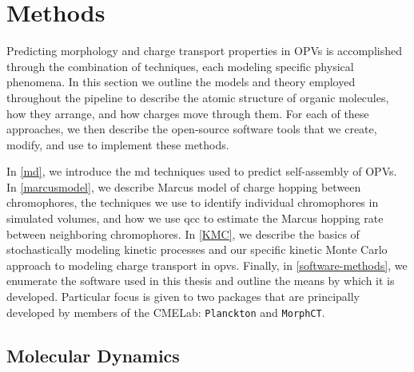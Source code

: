 \chapter{Methods}
\label{methods}

Predicting morphology and charge transport properties in OPVs is accomplished through the combination 
of techniques, each modeling specific physical phenomena.
In this section we outline the models and theory employed throughout the pipeline to describe 
the atomic structure of organic molecules, how they arrange, and how charges move through them. 
For each of these approaches, we then describe the open-source software tools that we create, modify, and use 
to implement these methods. 

In \autoref{md}, we introduce the \gls{md} techniques used to predict self-assembly of OPVs.
In \autoref{marcusmodel}, we describe Marcus model of charge hopping between chromophores,
the techniques we use to identify individual chromophores in simulated volumes, 
and how we use \gls{qcc} to estimate the Marcus hopping rate between
neighboring chromophores.
In \autoref{KMC}, we describe the basics of stochastically modeling kinetic processes and 
our specific kinetic Monte Carlo approach to modeling charge transport in \gls{opv}s.
Finally, in \autoref{software-methods}, we enumerate the software used in this thesis and outline the means by
which it is developed. Particular focus is given to two packages that are
principally developed by members of the CMELab:
\texttt{Planckton} and \texttt{MorphCT}.  
 

\section{Molecular Dynamics}

\label{md}

